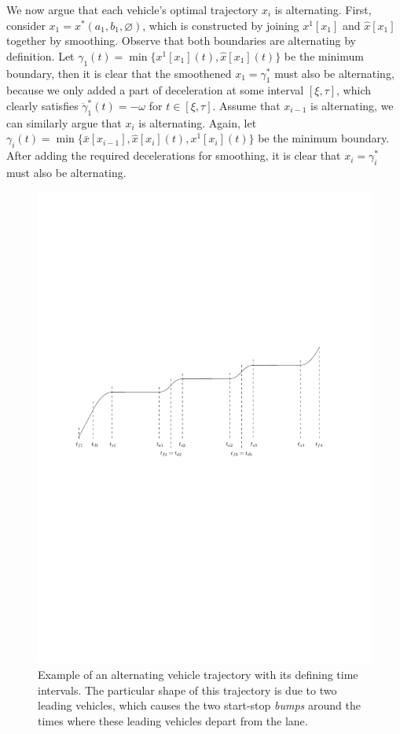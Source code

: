 \documentclass[a4paper]{article}
\theoremstyle{definition}
\theoremstyle{plain}
\begin{document}
We now argue that each vehicle's optimal trajectory $x_{i}$ is alternating.
First, consider $x_{1} = x^{*}(a_{1}, b_{1}, \varnothing)$, which is
constructed by joining $x^{1}[x_{1}]$ and $\hat{x}[x_{1}]$ together by smoothing. Observe that both boundaries are alternating by definition. Let
$\gamma_{1}(t) = \min\{x^{1}[x_{1}](t), \hat{x}[x_{1}](t) \}$ be the minimum boundary,
then it is clear that the smoothened $x_{1} = \gamma_{1}^{*}$ must also be
alternating, because we only added a part of deceleration at some interval
$[\xi, \tau]$, which clearly satisfies $\ddot{\gamma}_{1}^{*}(t) = -\omega$ for
$t \in [\xi,\tau]$.
%
Assume that $x_{i-1}$ is alternating, we can similarly argue that $x_{i}$ is
alternating. Again, let
$\gamma_{i}(t) = \min\{\bar{x}[x_{i-1}], \hat{x}[x_{i}](t), x^{1}[x_{i}](t)\}$ be the
minimum boundary. After adding the required decelerations for smoothing, it is
clear that $x_{i} = \gamma^{*}_{i}$ must also be alternating.

\begin{figure}
  \centering
  \includegraphics[scale=0.9]{figures/motion/tandem_trajectory}
  \caption{Example of an alternating vehicle trajectory with its defining time
    intervals. The particular shape of this trajectory is due to two leading
    vehicles, which causes the two start-stop \emph{bumps} around the times where these
    leading vehicles depart from the lane.}
  \label{fig:tandem_trajectory}
\end{figure}
\end{document}
